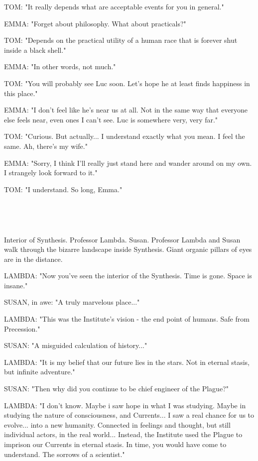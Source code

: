 \documentclass[11pt]{article}
\begin{document}
TOM: "It really depends what are acceptable events for you in general."

EMMA: "Forget about philosophy.
What about practicals?"

TOM: "Depends on the practical utility of a human race that is forever shut inside a black shell."

EMMA: "In other words, not much."

TOM: "You will probably see Luc soon.
Let's hope he at least finds happiness in this place."

EMMA: "I don't feel like he's near us at all.
Not in the same way that everyone else feels near, even ones I can't see.
Luc is somewhere very, very far."

TOM: "Curious. But actually... I understand exactly what you mean.
I feel the same.
Ah, there's my wife."

EMMA: "Sorry, I think I'll really just stand here and wander around on my own.
I strangely look forward to it."

TOM: "I understand. So long, Emma."

\ 

\ 

Interior of Synthesis.
Professor Lambda. Susan. 
Professor Lambda and Susan walk through the bizarre landscape inside Synthesis.
Giant organic pillars of eyes are in the distance.

LAMBDA: "Now you've seen the interior of the Synthesis.
Time is gone. Space is insane."

SUSAN, in awe: "A truly marvelous place..."

LAMBDA: "This was the Institute's vision - the end point of humans. 
Safe from Precession."

SUSAN: "A misguided calculation of history..."

LAMBDA: "It is my belief that our future lies in the stars. 
Not in eternal stasis, but infinite adventure."

SUSAN: "Then why did you continue to be chief engineer of the Plague?"

LAMBDA: "I don't know. 
Maybe i saw hope in what I was studying.
Maybe in studying the nature of consciousness, and Currents...
I saw a real chance for us to evolve...
into a new humanity.
Connected in feelings and thought, but still individual actors, in the real world...
Instead, the Institute used the Plague to imprison our Currents in eternal stasis.
In time, you would have come to understand.
The sorrows of a scientist."
\end{document}
